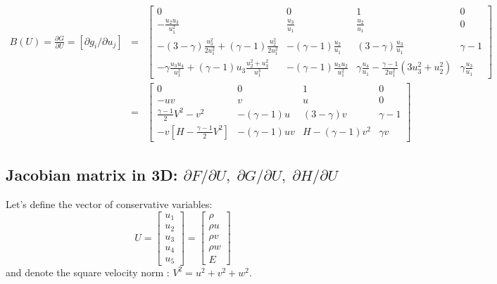 \documentclass{article}
\begin{document}
\begin{eqnarray}
  B(U) = \frac{\partial G}{\partial U} = \left[ \partial g_i/\partial u_j \right] & = & \left[
    \begin{array}{cccc}
      0 & 0 & 1 & 0\\
      -\frac{u_2 u_3}{u_1^2} & \frac{u_3}{u_1} & \frac{u_2}{u_1} & 0\\
      -(3-\gamma)\frac{u_3^2}{2 u_1^2} + (\gamma-1)\frac{u_2^2}{2 u_1^2} & -(\gamma-1)\frac{u_2}{u_1} & (3-\gamma) \frac{u_3}{u_1} & \gamma-1\\
       -\gamma\frac{u_3 u_4}{u_1^2} + (\gamma-1)u_3 \frac{u_2^2+u_3^2}{u_1^3} & -(\gamma-1)\frac{u_3 u_2}{u_1^2} & \gamma \frac{u_4}{u_1} -\frac{\gamma-1}{2 u_1^2} (3u_3^2+u_2^2) &\gamma \frac{u_3}{u_1}
    \end{array}
  \right]\\
  &=& \left[
    \begin{array}{cccc}
      0 & 0 & 1 & 0\\
      -u v & v & u & 0\\
      \frac{\gamma-1}{2}V^2-v^2 & -(\gamma-1)u  & (3-\gamma) v & \gamma-1\\
      - v [H-\frac{\gamma-1}{2} V^2 ] & -(\gamma-1)uv & H-(\gamma-1)v^2 &\gamma v
    \end{array}
  \right]
\end{eqnarray}

\newpage 
\subsection{Jacobian matrix in 3D: \boldmath $\partial F/\partial U, \; \partial G/\partial U, \; \partial H/\partial U$}

Let's define the vector of conservative variables:
\begin{equation}
  U = \left[
    \begin{array}{c}
      u_1\\
      u_2\\
      u_3\\
      u_4\\
      u_5
    \end{array}
  \right] = \left[
    \begin{array}{c}
      \rho\\
      \rho u\\
      \rho v\\
      \rho w\\
      E
    \end{array}
  \right]
\end{equation}
and denote the square velocity norm : $V^2=u^2+v^2+w^2$.
\end{document}
